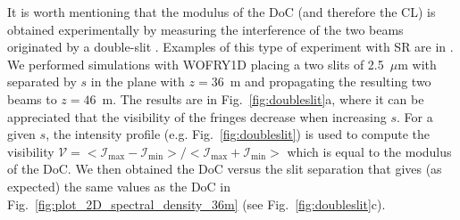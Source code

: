 \documentclass{iucr}              %
\begin{document}
It is worth mentioning that the modulus of the DoC (and therefore the CL) is obtained experimentally by measuring the interference of the two beams originated by a double-slit \cite{ThompsonWolf1957}. Examples of this type of experiment with SR are in \cite{Chang2000, Paterson2001, Leitenberger2003}. We performed simulations with WOFRY1D placing a two slits of 2.5~$\mu$m with separated by $s$ in the plane with $z=36$~m and propagating the resulting two beams to $z=46$~m. The results are in Fig.~\ref{fig:doubleslit}a, where it can be appreciated that the visibility of the fringes decrease when increasing $s$. For a given $s$, the intensity profile (e.g. Fig.~\ref{fig:doubleslit}) is used to compute the visibility $\mathcal{V}=<\mathcal{I}_{\text{max}}-\mathcal{I}_{\text{min}}>/<\mathcal{I}_{\text{max}}+\mathcal{I}_{\text{min}}>$ which is equal to the modulus of the DoC. We then obtained the DoC versus the slit separation that gives (as expected) the same values as the DoC in Fig.~\ref{fig:plot_2D_spectral_density_36m} (see Fig.~\ref{fig:doubleslit}c). 
\end{document}
